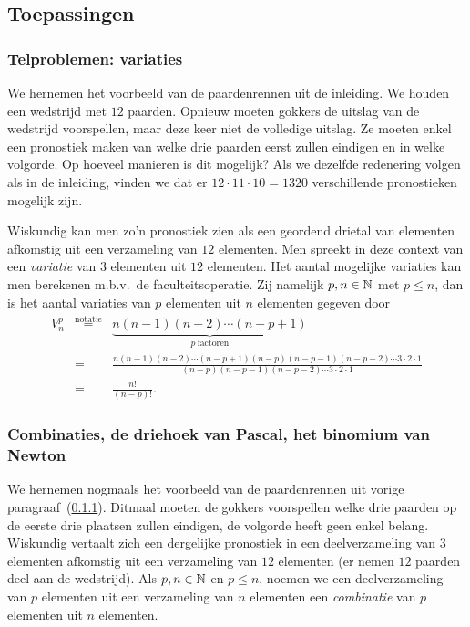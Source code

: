 \documentclass{ximera}
\begin{document}
\subsection{Toepassingen}
\subsubsection{Telproblemen: variaties}\label{M02_pr}
We hernemen het voorbeeld van de paardenrennen uit de inleiding.
We houden een wedstrijd met $12$ paarden. Opnieuw moeten gokkers
de uitslag van de wedstrijd voorspellen, maar deze keer niet de
volledige uitslag. Ze moeten enkel een pronostiek maken van welke
drie paarden eerst zullen eindigen en in welke volgorde. Op
hoeveel manieren is dit mogelijk? Als we dezelfde redenering
volgen als in de inleiding, vinden we dat er
$12\cdot11\cdot10=1320$ verschillende pronostieken mogelijk zijn.

Wiskundig kan men zo'n pronostiek zien als een geordend drietal
van elementen afkomstig uit een verzameling van $12$ elementen.
Men spreekt in deze context van een \emph{variatie} van $3$
elementen uit $12$ elementen. Het aantal mogelijke variaties kan
men berekenen m.b.v.~de faculteitsoperatie. Zij namelijk
$p,n\in\mathbb{N}$ met $p\leqslant n$, dan is het aantal variaties van $p$
elementen uit $n$ elementen gegeven door
\begin{eqnarray*}
  V^p_n &\overset{\textrm{notatie}}{=}& \underbrace{n(n-1)(n-2)\cdots(n-p+1)}_{p\
\textrm{factoren}}\\
&=&
\frac{n(n-1)(n-2)\cdots(n-p+1)(n-p)(n-p-1)(n-p-2)\cdots3\cdot2\cdot1}{(n-p)(n-p-1)(n-p-2)\cdots3\cdot2\cdot1}\\
&=& \frac{n!}{(n-p)!}.
\end{eqnarray*}

\subsubsection{Combinaties, de driehoek van Pascal,
het binomium van Newton} We hernemen nogmaals het voorbeeld van de
paardenrennen uit vorige paragraaf~(\ref{M02_pr}). Ditmaal moeten de
gokkers voorspellen welke drie paarden op de eerste drie plaatsen
zullen eindigen, de volgorde heeft geen enkel belang. Wiskundig
vertaalt zich een dergelijke pronostiek in een deelverzameling van
$3$ elementen afkomstig uit een verzameling van $12$ elementen (er
nemen $12$ paarden deel aan de wedstrijd). Als $p,n\in\mathbb{N}$ en
$p\leqslant n$, noemen we een deelverzameling van $p$ elementen
uit een verzameling van $n$ elementen een \emph{combinatie} van
$p$ elementen uit $n$ elementen.
\end{document}
